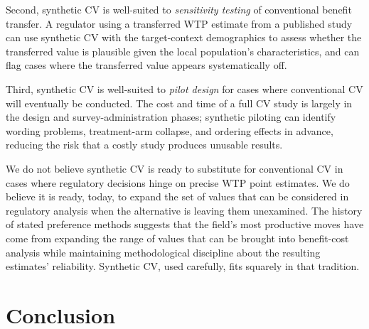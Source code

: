 \documentclass[12pt]{article}
\begin{document}
Second, synthetic CV is well-suited to \emph{sensitivity testing} of conventional benefit transfer. A regulator using a transferred WTP estimate from a published study can use synthetic CV with the target-context demographics to assess whether the transferred value is plausible given the local population's characteristics, and can flag cases where the transferred value appears systematically off.

Third, synthetic CV is well-suited to \emph{pilot design} for cases where conventional CV will eventually be conducted. The cost and time of a full CV study is largely in the design and survey-administration phases; synthetic piloting can identify wording problems, treatment-arm collapse, and ordering effects in advance, reducing the risk that a costly study produces unusable results.

We do not believe synthetic CV is ready to substitute for conventional CV in cases where regulatory decisions hinge on precise WTP point estimates. We do believe it is ready, today, to expand the set of values that can be considered in regulatory analysis when the alternative is leaving them unexamined. The history of stated preference methods suggests that the field's most productive moves have come from expanding the range of values that can be brought into benefit-cost analysis while maintaining methodological discipline about the resulting estimates' reliability. Synthetic CV, used carefully, fits squarely in that tradition.

\section{Conclusion}

\newpage
\printbibliography

%
%
%
\end{document}
